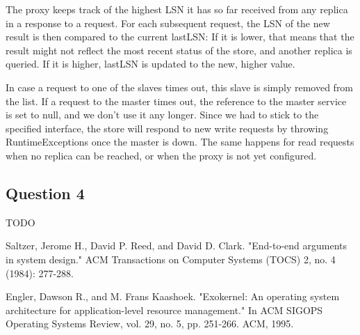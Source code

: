 \documentclass[12pt,a4paper,fleqn]{article}
\begin{document}
The proxy keeps track of the highest LSN it has so far received from any replica in a response to a request. For each subsequent request, the LSN of the new result is then compared to the current lastLSN: If it is lower, that means that the result might not reflect the most recent status of the store, and another replica is queried. If it is higher, lastLSN is updated to the new, higher value. 

In case a request to one of the slaves times out, this slave is simply removed from the list. If a request to the master times out, the reference to the master service is set to null, and we don't use it any longer. Since we had to stick to the specified interface, the store will respond to new write requests by throwing RuntimeExceptions once the master is down. The same happens for read requests when no replica can be reached, or when the proxy is not yet configured.

\subsection*{Question 4}
\label{sec:pq4}
TODO


\begin{thebibliography}{1}

 Saltzer, Jerome H., David P. Reed, and David D. Clark. "End-to-end arguments in system design." ACM Transactions on Computer Systems (TOCS) 2, no. 4 (1984): 277-288.

 Engler, Dawson R., and M. Frans Kaashoek. "Exokernel: An operating system architecture for application-level resource management." In ACM SIGOPS Operating Systems Review, vol. 29, no. 5, pp. 251-266. ACM, 1995.

\end{thebibliography}
\end{document}
